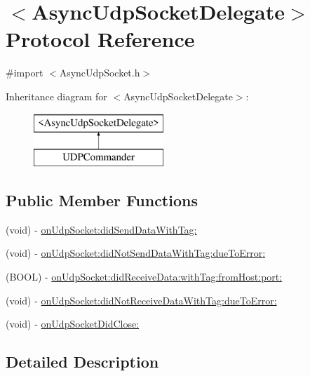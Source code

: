 \hypertarget{protocol_async_udp_socket_delegate-p}{
\section{$<$AsyncUdpSocketDelegate$>$ Protocol Reference}
\label{protocol_async_udp_socket_delegate-p}
}


{\ttfamily \#import $<$AsyncUdpSocket.h$>$}

Inheritance diagram for $<$AsyncUdpSocketDelegate$>$:\begin{figure}[H]
\begin{center}
\leavevmode
\includegraphics[height=2.000000cm]{protocol_async_udp_socket_delegate-p}
\end{center}
\end{figure}
\subsection*{Public Member Functions}
\begin{DoxyCompactItemize}
\item 
(void) -\/ \hyperlink{protocol_async_udp_socket_delegate-p_a492232e28b2df9ee319fca63440bb437}{onUdpSocket:didSendDataWithTag:}
\item 
(void) -\/ \hyperlink{protocol_async_udp_socket_delegate-p_a2cdf1655cf80377847e98a665dadb729}{onUdpSocket:didNotSendDataWithTag:dueToError:}
\item 
(BOOL) -\/ \hyperlink{protocol_async_udp_socket_delegate-p_a8f55d05bf65ee76ee036561a37f964fc}{onUdpSocket:didReceiveData:withTag:fromHost:port:}
\item 
(void) -\/ \hyperlink{protocol_async_udp_socket_delegate-p_a41a517d14fcd32c8cbf9d2dded2eef3e}{onUdpSocket:didNotReceiveDataWithTag:dueToError:}
\item 
(void) -\/ \hyperlink{protocol_async_udp_socket_delegate-p_a8277c75d6953cfdc7fec0f46672e98d0}{onUdpSocketDidClose:}
\end{DoxyCompactItemize}


\subsection{Detailed Description}


